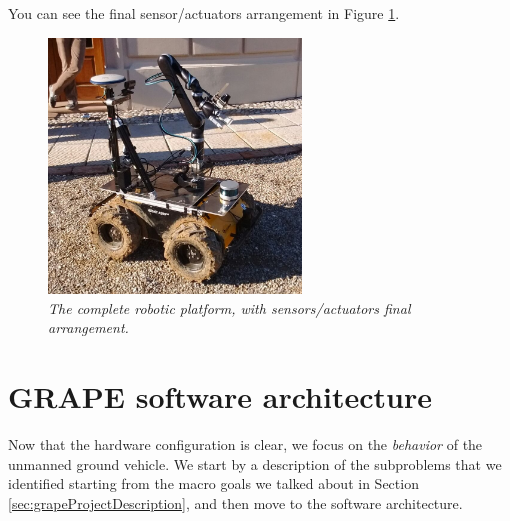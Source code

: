 You can see the final sensor/actuators arrangement in Figure \ref{fig:disposizioneFinale}.
\begin{figure}
	\centering
	\includegraphics[width=0.6\textwidth]{Images/grape_sw_hw_architecture/disposizioneFinale.jpeg}
	\caption{\textit{The complete robotic platform, with sensors/actuators final arrangement.}}
	\label{fig:disposizioneFinale}
\end{figure}
 
\section{GRAPE software architecture}\label{sec:grapeSwArch}

Now that the hardware configuration is clear, we focus on the \textit{behavior} of the unmanned ground vehicle. We start by a description of the subproblems that we identified starting from the macro goals we talked about in Section \ref{sec:grapeProjectDescription}, and then move to the software architecture. \\

